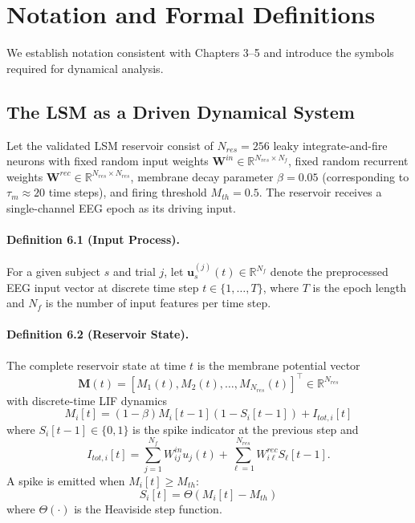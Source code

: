 \section{Notation and Formal Definitions}
\label{sec:dynamics_notation}

We establish notation consistent with Chapters 3--5 and introduce the symbols required for dynamical analysis.

\subsection{The LSM as a Driven Dynamical System}

Let the validated LSM reservoir consist of $N_{res}=256$ leaky integrate-and-fire neurons with fixed random input weights $\mathbf{W}^{in} \in \mathbb{R}^{N_{res} \times N_f}$, fixed random recurrent weights $\mathbf{W}^{rec} \in \mathbb{R}^{N_{res} \times N_{res}}$, membrane decay parameter $\beta=0.05$ (corresponding to $\tau_m \approx 20$ time steps), and firing threshold $M_{th}=0.5$. The reservoir receives a single-channel EEG epoch as its driving input.

\paragraph{Definition 6.1 (Input Process).}
For a given subject $s$ and trial $j$, let $\mathbf{u}^{(j)}_s(t) \in \mathbb{R}^{N_f}$ denote the preprocessed EEG input vector at discrete time step $t \in \{1,\ldots,T\}$, where $T$ is the epoch length and $N_f$ is the number of input features per time step.

\paragraph{Definition 6.2 (Reservoir State).}
The complete reservoir state at time $t$ is the membrane potential vector
\begin{equation}
\mathbf{M}(t) = [M_1(t), M_2(t), \ldots, M_{N_{res}}(t)]^{\top} \in \mathbb{R}^{N_{res}}
\end{equation}
with discrete-time LIF dynamics
\begin{equation}
M_i[t] = (1-\beta)M_i[t-1](1-S_i[t-1]) + I_{tot,i}[t]
\end{equation}
where $S_i[t-1] \in \{0,1\}$ is the spike indicator at the previous step and
\begin{equation}
I_{tot,i}[t] = \sum_{j=1}^{N_f} W^{in}_{ij}u_j(t) + \sum_{\ell=1}^{N_{res}} W^{rec}_{i\ell}S_{\ell}[t-1].
\end{equation}
A spike is emitted when $M_i[t] \ge M_{th}$:
\begin{equation}
S_i[t] = \Theta(M_i[t]-M_{th})
\end{equation}
where $\Theta(\cdot)$ is the Heaviside step function.

